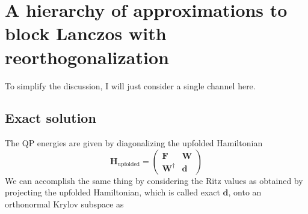 \section{A hierarchy of approximations to block Lanczos with reorthogonalization}
To simplify the discussion, I will just consider a single channel here.
\subsection{Exact solution}
The QP energies are given by diagonalizing the upfolded Hamiltonian
\begin{equation}
    \bm{H}_{\text{upfolded}}= \begin{pmatrix}
        \bm{F} & \bm{W}\\
        \bm{W}^{\dagger} & \bm{d}
    \end{pmatrix}
\end{equation}
We can accomplish the same thing by considering the Ritz values as obtained by projecting the upfolded Hamiltonian, which is called exact $\bm{d}$, onto an orthonormal Krylov subspace as

